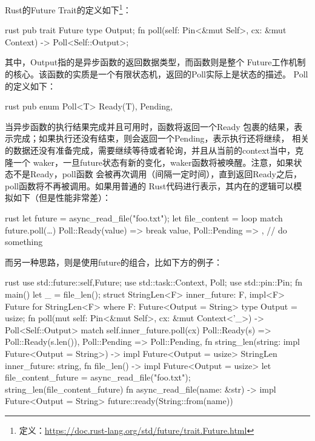 Rust的Future Trait的定义如下\footnote{定义：\url{https://doc.rust-lang.org/std/future/trait.Future.html}}：
\begin{code-block}{rust}
pub trait Future {
    type Output;
    fn poll(self: Pin<&mut Self>, cx: &mut Context) -> Poll<Self::Output>;
}
\end{code-block}
其中，Output指的是异步函数的返回数据类型，而函数则是整个
Future工作机制的核心。该函数的实质是一个有限状态机，返回的Poll实际上是状态的描述。
Poll的定义如下：
\begin{code-block}{rust}
pub enum Poll<T> {
    Ready(T),
    Pending,
}
\end{code-block}
当异步函数的执行结果完成并且可用时，函数将返回一个Ready
包裹的结果，表示完成；如果执行还没有结束，则会返回一个Pending，表示执行还将继续，
相关的数据还没有准备完成，需要继续等待或者轮询，并且从当前的context当中，克隆一个
waker，一旦future状态有新的变化，waker函数将被唤醒。注意，如果状态不是Ready，poll函数
会被再次调用（间隔一定时间），直到返回Ready之后，poll函数将不再被调用。如果用普通的
Rust代码进行表示，其内在的逻辑可以模拟如下（但是性能非常差）：
\begin{code-block}{rust}
let future = async_read_file("foo.txt");
let file_content = loop {
    match future.poll(…) {
        Poll::Ready(value) => break value,
        Poll::Pending => {}, // do something
    }
}
\end{code-block}

而另一种思路，则是使用future的组合，比如下方的例子：
\begin{code-block}{rust}
use std::future::{self,Future};
use std::task::{Context, Poll};
use std::pin::Pin;
fn main() {
    let _ = file_len();
}
struct StringLen<F> {
    inner_future: F,
}
impl<F> Future for StringLen<F> where F: Future<Output = String>{
    type Output = usize;
    fn poll(mut self: Pin<&mut Self>, cx: &mut Context<'_>) -> Poll<Self::Output> {
        match self.inner_future.poll(cx) {
            Poll::Ready(s) => Poll::Ready(s.len()),
            Poll::Pending => Poll::Pending,
        }
    }
}
fn string_len(string: impl Future<Output = String>)
    -> impl Future<Output = usize>
{
    StringLen {
        inner_future: string,
    }
}
fn file_len() -> impl Future<Output = usize> {
    let file_content_future = async_read_file("foo.txt");
    string_len(file_content_future)
}
fn async_read_file(name: &str) -> impl Future<Output = String> {
    future::ready(String::from(name))
}
\end{code-block}

